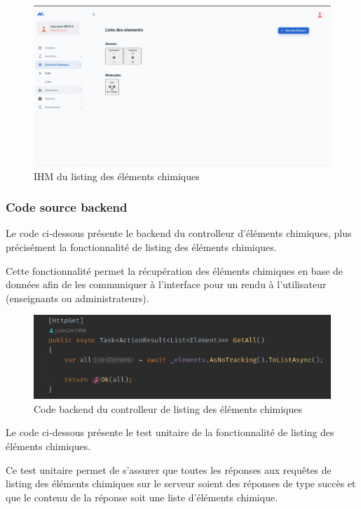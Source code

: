 \begin{figure}[H]
	\centering
	\includegraphics[width=1\textwidth]{img/ietl}
	\caption{IHM du listing des éléments chimiques}
	\label{fig:mesh1}
\end{figure}

\subsubsection{Code source backend}

Le code ci-dessous présente le backend du controlleur d'éléments chimiques, plus précisément la fonctionnalité de listing des éléments chimiques.

Cette fonctionnalité permet la récupération des éléments chimiques en base de données afin de les communiquer à l'interface pour un rendu à l'utilisateur (enseignants ou administrateurs).

\begin{figure}[H]
	\centering
	\includegraphics[width=1\textwidth]{img/cetl}
	\caption{Code backend du controlleur de listing des éléments chimiques}
\end{figure}

Le code ci-dessous présente le test unitaire de la fonctionnalité de listing des éléments chimiques.

Ce test unitaire permet de s'assurer que toutes les réponses aux requêtes de listing des éléments chimiques sur le serveur soient des réponses de type succès et que le contenu de la réponse soit une liste d'éléments chimique.

